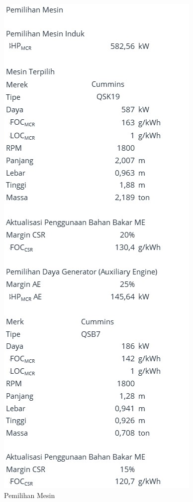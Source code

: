 \begin{figure}[!ht]
    \centering
    \includegraphics[width=0.95\linewidth,height=0.95\textheight,keepaspectratio]{lampiran/deskap-4.jpg}
    \caption*{Pemilihan Mesin}
\end{figure}

